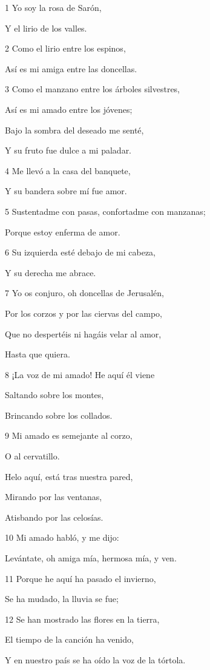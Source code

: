 \par 1 Yo soy la rosa de Sarón,
\par Y el lirio de los valles.
\par 2 Como el lirio entre los espinos,
\par Así es mi amiga entre las doncellas.
\par 3 Como el manzano entre los árboles silvestres,
\par Así es mi amado entre los jóvenes;
\par Bajo la sombra del deseado me senté,
\par Y su fruto fue dulce a mi paladar.
\par 4 Me llevó a la casa del banquete,
\par Y su bandera sobre mí fue amor.
\par 5 Sustentadme con pasas, confortadme con manzanas;
\par Porque estoy enferma de amor.
\par 6 Su izquierda esté debajo de mi cabeza,
\par Y su derecha me abrace.
\par 7 Yo os conjuro, oh doncellas de Jerusalén,
\par Por los corzos y por las ciervas del campo,
\par Que no despertéis ni hagáis velar al amor,
\par Hasta que quiera.
\par 8 ¡La voz de mi amado! He aquí él viene
\par Saltando sobre los montes,
\par Brincando sobre los collados.
\par 9 Mi amado es semejante al corzo,
\par O al cervatillo.
\par Helo aquí, está tras nuestra pared,
\par Mirando por las ventanas,
\par Atisbando por las celosías.
\par 10 Mi amado habló, y me dijo:
\par Levántate, oh amiga mía, hermosa mía, y ven.
\par 11 Porque he aquí ha pasado el invierno,
\par Se ha mudado, la lluvia se fue;
\par 12 Se han mostrado las flores en la tierra,
\par El tiempo de la canción ha venido,
\par Y en nuestro país se ha oído la voz de la tórtola.
